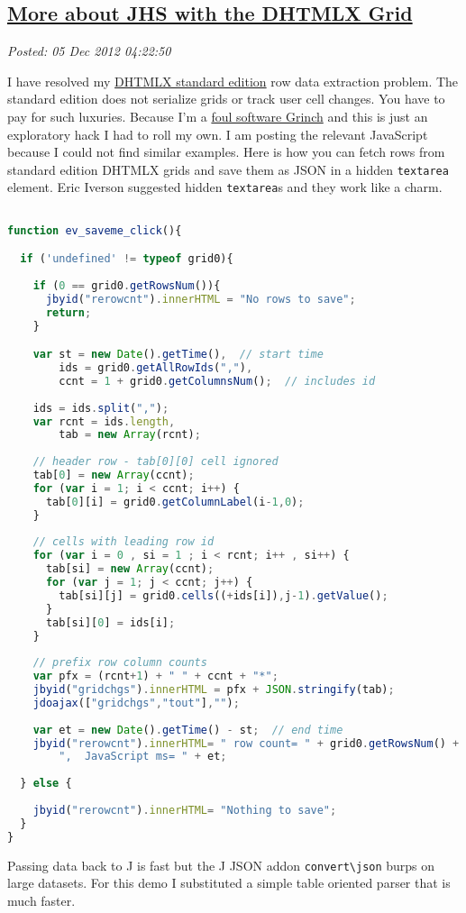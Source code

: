 %

\subsection*{\href{https://bakerjd99.wordpress.com/2012/12/04/more-about-jhs-with-dhtmlx-the-grid/}{More about JHS with the DHTMLX Grid}}


\noindent\emph{Posted: 05 Dec 2012 04:22:50}
\vspace{6pt}

I have resolved my \href{http://dhtmlx.com/docs/download.shtml}{DHTMLX
standard edition} row data extraction problem. The standard edition does
not serialize grids or track user cell changes. You have to pay for such
luxuries. Because I'm a
\href{http://www.youtube.com/watch?v=ZgP0aUKlmNw}{foul software Grinch}
and this is just an exploratory hack I had to roll my own. I am posting
the relevant JavaScript because I could not find similar examples. Here
is how you can fetch rows from standard edition DHTMLX grids and save
them as JSON in a hidden \texttt{textarea} element. Eric Iverson
suggested hidden \texttt{textarea}s and they work like a charm.


\begin{lstlisting}[language=JavaScript,frame=single,framerule=0pt,label=lst:scr3516X0]

function ev_saveme_click(){

  if ('undefined' != typeof grid0){
  
    if (0 == grid0.getRowsNum()){
      jbyid("rerowcnt").innerHTML = "No rows to save"; 
      return;
    }

    var st = new Date().getTime(),  // start time  
        ids = grid0.getAllRowIds(","),
        ccnt = 1 + grid0.getColumnsNum();  // includes id
      
    ids = ids.split(",");  
    var rcnt = ids.length,
        tab = new Array(rcnt);
    
    // header row - tab[0][0] cell ignored
    tab[0] = new Array(ccnt);  
    for (var i = 1; i < ccnt; i++) {
      tab[0][i] = grid0.getColumnLabel(i-1,0); 
    }
     
    // cells with leading row id
    for (var i = 0 , si = 1 ; i < rcnt; i++ , si++) {
      tab[si] = new Array(ccnt);
      for (var j = 1; j < ccnt; j++) {
        tab[si][j] = grid0.cells((+ids[i]),j-1).getValue();
      }
      tab[si][0] = ids[i];
    }
  
    // prefix row column counts 
    var pfx = (rcnt+1) + " " + ccnt + "*";
    jbyid("gridchgs").innerHTML = pfx + JSON.stringify(tab);
    jdoajax(["gridchgs","tout"],"");
  
    var et = new Date().getTime() - st;  // end time    
    jbyid("rerowcnt").innerHTML= " row count= " + grid0.getRowsNum() +  
        ",  JavaScript ms= " + et; 
        
  } else {
  
    jbyid("rerowcnt").innerHTML= "Nothing to save";     
  }
}
\end{lstlisting}

Passing data back to J is fast but the J JSON addon
\texttt{convert\textbackslash{}json} burps on large datasets. For this
demo I substituted a simple table oriented parser that is much faster.



%